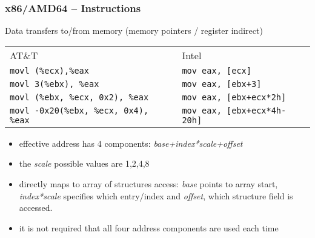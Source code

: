 \documentclass{beamer}
\begin{document}
\begin{frame}
\frametitle{x86/AMD64 -- Instructions}
Data transfers to/from memory (memory pointers / register indirect)\\
\begin{tabular}{ l l}
AT\&T & Intel \\
\texttt{movl (\%ecx),\%eax} & \texttt{mov eax, [ecx]}\\
\texttt{movl 3(\%ebx), \%eax} & \texttt{mov eax, [ebx+3]} \\
\texttt{movl (\%ebx, \%ecx, 0x2), \%eax} & \texttt{mov eax, [ebx+ecx*2h]} \\
\texttt{movl -0x20(\%ebx, \%ecx, 0x4), \%eax} & \texttt{mov eax, [ebx+ecx*4h-20h]} \\
\end{tabular}

\begin{itemize}
\item effective address has 4 components: \emph{base+index*scale+offset}
\item the \emph{scale} possible values are 1,2,4,8
\item directly maps to array of structures access: \emph{base} points to array start, \emph{index*scale} specifies which entry/index and \emph{offset}, which structure field is accessed.
\item it is not required that all four address components are used each time
\end{itemize}
\end{frame}
\end{document}
